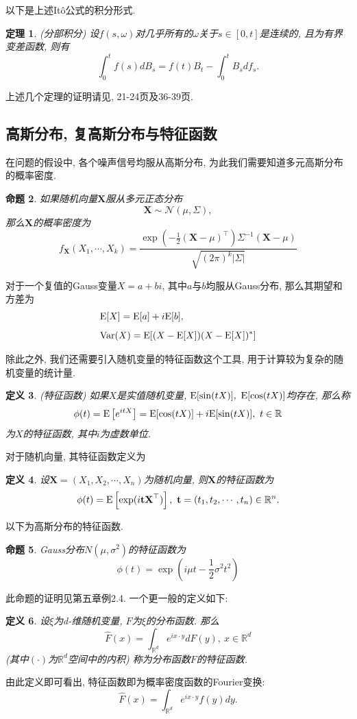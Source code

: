 \documentclass[notitlepage,cs4size,punct,oneside]{ctexrep}
\numberwithin{equation}{section}
\theoremstyle{mystyle}
\newtheorem{definition}{\hspace{2em}定义}[section]
\newtheorem{theorem}[definition]{\hspace{2em}定理}
\newtheorem{proposition}[definition]{\hspace{2em}命题}
\begin{document}
以下是上述It\^{o}公式的积分形式.
\begin{theorem} \label{Itoint}(分部积分) 设$f(s, \omega)$对几乎所有的$\omega$关于$s\in [0, t]$是连续的, 且为有界变差函数, 则有
$$\int_0^t f(s)dB_s = f(t)B_t - \int_0^t B_s df_s.$$
\end{theorem}
上述几个定理的证明请见\cite{oksendal2003stochastic}, 21-24页及36-39页. \\

\subsection{高斯分布, 复高斯分布与特征函数}
在问题的假设中, 各个噪声信号均服从高斯分布, 为此我们需要知道多元高斯分布的概率密度\cite{shuyuanhe2006probability}.
\begin{proposition} \label{multiVariable gaussian pdf}
如果随机向量$\textbf{X}$服从多元正态分布
$$\textbf{X} \sim \mathcal{N}(\mu, \Sigma),$$
那么$\textbf{X}$的概率密度为
$$f_\textbf{X}(X_1, \cdots, X_k) = \frac{\exp\left(-\frac{1}{2}(\textbf{X}-\mu)^\top\right)\Sigma^{-1}(\textbf{X}-\mu)}{\sqrt{(2\pi)^k|\Sigma|}}$$
\end{proposition}
对于一个复值的Gauss变量$X = a+bi$, 其中$a$与$b$均服从Gauss分布, 那么其期望和方差为
\[
\begin{split}
&\text{E}[X] = \text{E}[a] + i\text{E}[b], \\[5pt]
&\text{Var}(X) = \text{E}[(X-\text{E}[X])(X-\text{E}[X])^*]
\end{split}
\]

除此之外, 我们还需要引入随机变量的特征函数这个工具, 用于计算较为复杂的随机变量的统计量.
\begin{definition}(特征函数) 如果$X$是实值随机变量, $\text{E}[\sin(tX)], ~\text{E}[\cos(tX)]$均存在, 那么称
$$\phi(t) = \text{E}\left[e^{itX}\right] = \text{E}[\cos(tX)] + i\text{E}[\sin(tX)], ~t\in \mathbb{R}$$
为$X$的特征函数, 其中$i$为虚数单位.
\end{definition}
对于随机向量, 其特征函数定义为
\begin{definition} 设$\textbf{X} = (X_1, X_2, \cdots, X_n)$为随机向量, 则$\textbf{X}$的特征函数为
$$\phi(t) = \text{E}\left[\exp(i\textbf{t}\textbf{X}^\top)\right], ~\textbf{t} = (t_1, t_2, \cdots, t_n)\in \mathbb{R}^n.$$
\end{definition}
以下为高斯分布的特征函数.
\begin{proposition} \label{Characteristic function of Gaussian Distribution}
Gauss分布$N(\mu, \sigma^2)$的特征函数为
$$\phi(t) = \exp(i\mu t - \frac{1}{2}\sigma^2t^2)$$
\end{proposition}
此命题的证明见\cite{shuyuanhe2006probability}第五章例2.4.
一个更一般的定义如下\cite{jiangangying2013probability}:
\begin{definition} \label{characteristic function definition 2} 设$\xi$为d-维随机变量, $F$为$\xi$的分布函数. 那么
$$\hat{F}(x) = \int_{\mathbb{R}^d} e^{ix\cdot y}dF(y), ~x\in \mathbb{R}^d$$
(其中$(\cdot)$为$\mathbb{R}^d$空间中的内积) 称为分布函数$F$的特征函数.
\end{definition}
由此定义即可看出, 特征函数即为概率密度函数的Fourier变换:
\begin{equation} \label{characteristic function definition 3}
\hat{F}(x) = \int_{\mathbb{R}^d}e^{ix\cdot y}f(y)dy.
\end{equation}
\end{document}
